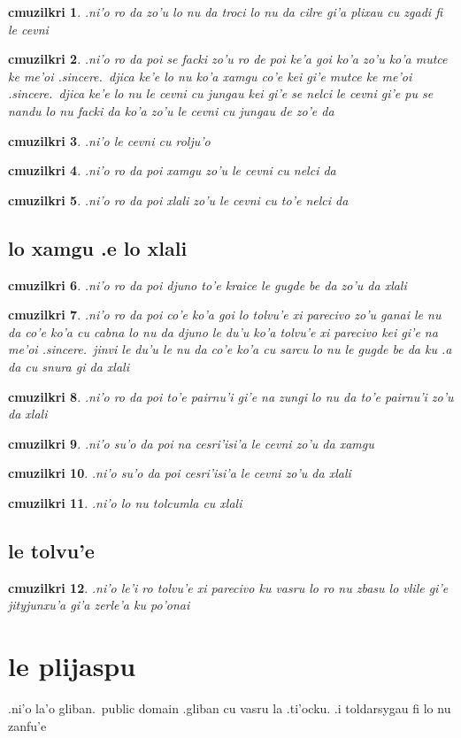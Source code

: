 \documentclass{report}
\newtheorem{cmuzilkri}{cmuzilkri}
\begin{document}
\begin{cmuzilkri}
        .ni'o ro da zo'u lo nu da troci lo nu da cilre gi'a plixau cu zgadi fi le cevni
\end{cmuzilkri}
\begin{cmuzilkri}
        .ni'o ro da poi se facki zo'u ro de poi ke'a goi ko'a zo'u ko'a mutce ke me'oi .sincere.\ djica ke'e lo nu ko'a xamgu co'e kei gi'e mutce ke me'oi .sincere.\ djica ke'e lo nu le cevni cu jungau kei gi'e se nelci le cevni gi'e pu se nandu lo nu facki da ko'a zo'u le cevni cu jungau de zo'e da
\end{cmuzilkri}
\begin{cmuzilkri}
	.ni'o le cevni cu rolju'o
\end{cmuzilkri}
\begin{cmuzilkri}
        .ni'o ro da poi xamgu zo'u le cevni cu nelci da
\end{cmuzilkri}
\begin{cmuzilkri}
        .ni'o ro da poi xlali zo'u le cevni cu to'e nelci da
\end{cmuzilkri}

\section{lo xamgu .e lo xlali}
\begin{cmuzilkri}
	.ni'o ro da poi djuno to'e kraice le gugde be da zo'u da xlali
\end{cmuzilkri}
\begin{cmuzilkri}
        .ni'o ro da poi co'e ko'a goi lo tolvu'e xi parecivo zo'u ganai le nu da co'e ko'a cu cabna lo nu da djuno le du'u ko'a tolvu'e xi parecivo kei gi'e na me'oi .sincere.\ jinvi le du'u le nu da co'e ko'a cu sarcu lo nu le gugde be da ku .a da cu snura gi da xlali
\end{cmuzilkri}
\begin{cmuzilkri}
	.ni'o ro da poi to'e pairnu'i gi'e na zungi lo nu da to'e pairnu'i zo'u da xlali
\end{cmuzilkri}
\begin{cmuzilkri}
        .ni'o su'o da poi na cesri'isi'a le cevni zo'u da xamgu
\end{cmuzilkri}
\begin{cmuzilkri}
        .ni'o su'o da poi cesri'isi'a le cevni zo'u da xlali
\end{cmuzilkri}
\begin{cmuzilkri}
        .ni'o lo nu tolcumla cu xlali
\end{cmuzilkri}

\section{le tolvu'e}
\begin{cmuzilkri}
        .ni'o le'i ro tolvu'e xi parecivo ku vasru lo ro nu zbasu lo vlile gi'e jityjunxu'a gi'a zerle'a ku po'onai
\end{cmuzilkri}

\chapter{le plijaspu}
.ni'o la'o gliban.\ public domain .gliban cu vasru la .ti'ocku.  .i toldarsygau fi lo nu zanfu'e
\end{document}
